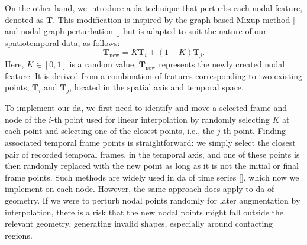 On the other hand, we introduce a \ac{da} technique that perturbs each nodal feature, denoted as $\mathbf{T}$. This modification is inspired by the graph-based Mixup method [\cite{guo2023,park2022}] and nodal graph perturbation [\cite{gibson2022}] but is adapted to suit the nature of our spatiotemporal data, as follows:
%
\begin{equation}\label{eq-interpolation}
    \mathbf{T}_{\text{new}} = K \mathbf{T}_i + (1 - K)\mathbf{T}_j.
\end{equation}
%
Here, $K \in [0, 1]$ is a random value, $\mathbf{T}_{\text{new}}$ represents the newly created nodal feature. It is derived from a combination of features corresponding to two existing points, $\mathbf{T}_i$ and $\mathbf{T}_j$, located in the spatial axis and temporal space.

To implement our \ac{da}, we first need to identify and move a selected frame and node of the $i$-th point used for linear interpolation by randomly selecting $K$ at each point and selecting one of the closest points, i.e., the $j$-th point. Finding associated temporal frame points is straightforward: we simply select the closest pair of recorded temporal frames, in the temporal axis, and one of these points is then randomly replaced with the new point as long as it is not the initial or final frame points. Such methods are widely used in \ac{da} of time series [\cite{oh2020}], which now we implement on each node. However, the same approach does apply to \ac{da} of geometry. If we were to perturb nodal points randomly for later augmentation by interpolation, there is a risk that the new nodal points might fall outside the relevant geometry, generating invalid shapes, especially around contacting regions.


